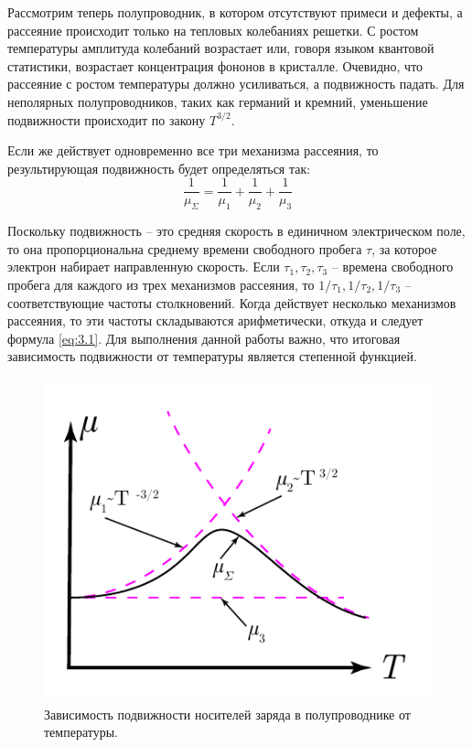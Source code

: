 		Рассмотрим теперь полупроводник, в котором отсутствуют примеси и дефекты, а рассеяние происходит только на тепловых
		колебаниях решетки. С ростом температуры амплитуда колебаний возрастает или, говоря языком квантовой статистики,
		возрастает концентрация фононов в кристалле. Очевидно, что рассеяние с ростом температуры должно усиливаться, а
		подвижность падать. Для неполярных полупроводников, таких как германий и кремний, уменьшение подвижности происходит по
		закону $T^{3/2}$. 
		
		Если же действует одновременно все три механизма рассеяния, то результирующая подвижность будет определяться так: 
		\begin{equation}
		\frac{1}{\mu_{\Sigma}} = \frac{1}{\mu_{1}}+\frac{1}{\mu_{2}}+\frac{1}{\mu_{3}}
		\label{eq:3.1}
		\end{equation}
		
		Поскольку подвижность – это средняя скорость в единичном электрическом поле, то она пропорциональна среднему времени
		свободного пробега $\tau$, за которое электрон набирает направленную скорость. Если $\tau_1, \tau_2,\tau_3$ – времена свободного
		пробега для каждого из трех механизмов рассеяния, то $1/\tau_1,1/\tau_2,1/\tau_3$ – соответствующие частоты столкновений. Когда
		действует несколько механизмов рассеяния, то эти частоты складываются арифметически, откуда и следует формула \eqref{eq:3.1}. Для
		выполнения данной работы важно, что итоговая зависимость подвижности от температуры является степенной функцией. 
		
		
		\begin{figure}[h!]
			\centering
			\includegraphics[width = .5\linewidth]{img/32}
			\caption{Зависимость подвижности носителей заряда в полупроводнике от температуры.}
			\label{fig:3.2}
		\end{figure}
		
